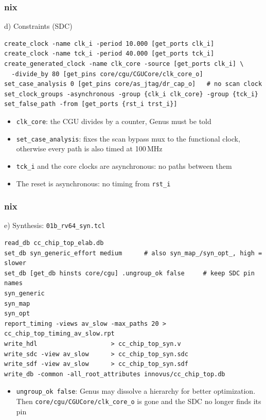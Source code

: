 \documentclass{beamer}
\newcommand{\astitle}{nix}
\newcommand{\assubtitle}{nix}
\newcommand{\cmd}[1]{\texttt{#1}}
\begin{document}
\renewcommand{\assubtitle}{d) Constraints (SDC)}
\begin{frame}[fragile]
\frametitle{\astitle}
\begin{block}{\assubtitle}
\begin{lstlisting}[style=sh]
create_clock -name clk_i -period 10.000 [get_ports clk_i]
create_clock -name tck_i -period 40.000 [get_ports tck_i]
create_generated_clock -name clk_core -source [get_ports clk_i] \
  -divide_by 80 [get_pins core/cgu/CGUCore/clk_core_o]
set_case_analysis 0 [get_pins core/as_jtag/dr_cap_o]   # no scan clock
set_clock_groups -asynchronous -group {clk_i clk_core} -group {tck_i}
set_false_path -from [get_ports {rst_i trst_i}]
\end{lstlisting}
  \begin{itemize}
    \item \cmd{clk\_core}: the CGU divides by a counter, Genus must be told
    \item \cmd{set\_case\_analysis}: fixes the scan bypass mux to the
      functional clock, otherwise every path is also timed at 100\,MHz
    \item \cmd{tck\_i} and the core clocks are asynchronous: no paths between them
    \item The reset is asynchronous: no timing from \cmd{rst\_i}
  \end{itemize}
\end{block}
\end{frame}

\renewcommand{\assubtitle}{e) Synthesis: \texttt{01b\_rv64\_syn.tcl}}
\begin{frame}[fragile]
\frametitle{\astitle}
\begin{block}{\assubtitle}
  \footnotesize
\begin{lstlisting}[style=sh]
read_db cc_chip_top_elab.db
set_db syn_generic_effort medium      # also syn_map_/syn_opt_, high = slower
set_db [get_db hinsts core/cgu] .ungroup_ok false     # keep SDC pin names
syn_generic
syn_map
syn_opt
report_timing -views av_slow -max_paths 20 > cc_chip_top_timing_av_slow.rpt
write_hdl                    > cc_chip_top_syn.v
write_sdc -view av_slow      > cc_chip_top_syn.sdc
write_sdf -view av_slow      > cc_chip_top_syn.sdf
write_db -common -all_root_attributes innovus/cc_chip_top.db
\end{lstlisting}
  \begin{itemize}
    \item \cmd{ungroup\_ok false}: Genus may dissolve a hierarchy for better
      optimization. Then \cmd{core/cgu/CGUCore/clk\_core\_o} is gone and the SDC
      no longer finds its pin
  \end{itemize}
\end{block}
\end{frame}
\end{document}
